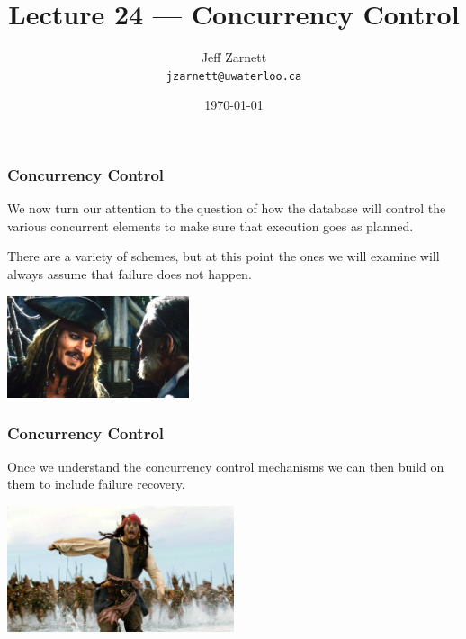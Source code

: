 

\title{Lecture 24 --- Concurrency Control }

\author{Jeff Zarnett \\ \small \texttt{jzarnett@uwaterloo.ca}}
\date{\today}




\begin{frame}
  \titlepage

 \end{frame}


\begin{frame}
\frametitle{Concurrency Control}

We now turn our attention to the question of how the database will control the various concurrent elements to make sure that execution goes as planned. 

There are a variety of schemes, but at this point the ones we will examine will always assume that failure does not happen. 

\begin{center}
	\includegraphics[width=0.4\textwidth]{images/couldgowrong.jpg}
\end{center}

 \end{frame}


\begin{frame}
\frametitle{Concurrency Control}

Once we understand the concurrency control mechanisms we can then build on them to include failure recovery.

\begin{center}
	\includegraphics[width=0.5\textwidth]{images/sparrow-run.jpg}
\end{center}

\end{frame}


